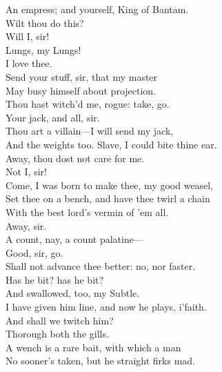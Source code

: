 \documentclass[a4paper,oneside]{memoir}
\begin{document}
\begin{drama*}
An empress; and yourself, King of Bantam.\\
\mammonspeaks Wilt thou do this?\\
\facespeaks {} Will I, sir!\\
\mammonspeaks {} Lungs, my Lungs!\\
I love thee.\\
\facespeaks {} Send your stuff, sir, that my master\\
May busy himself about projection.\\
\mammonspeaks Thou hast witch'd me, rogue: take, go.\\
\facespeaks {} Your jack, and all, sir.\\
\mammonspeaks Thou art a villain---I will send my jack,\\
And the weights too. Slave, I could bite thine ear.\\
Away, thou dost not care for me.\\
\facespeaks {} Not I, sir!\\
\mammonspeaks Come, I was born to make thee, my good weasel,\\
Set thee on a bench, and have thee twirl a chain\\
With the best lord's vermin of 'em all.\\
\facespeaks {} Away, sir.\\
\mammonspeaks A count, nay, a count palatine---\\
\facespeaks {} Good, sir, go.\\
\mammonspeaks Shall not advance thee better: no, nor faster.\\
\subtlespeaks Has he bit? has he bit?\\
\facespeaks {} And swallowed, too, my Subtle.\\
I have given him line, and now he plays, i'faith.\\
\subtlespeaks And shall we twitch him?\\
\facespeaks {} Thorough both the gills.\\
A wench is a rare bait, with which a man\\
No sooner's taken, but he straight firks mad.\\

\end{drama*}
\end{document}
